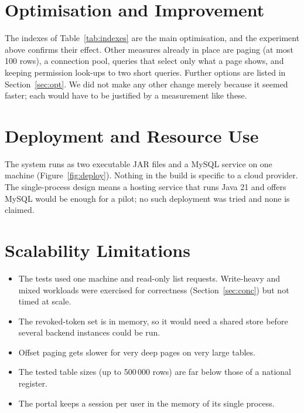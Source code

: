 \section{Optimisation and Improvement}
The indexes of Table~\ref{tab:indexes} are the main optimisation, and the experiment above
confirms their effect. Other measures already in place are paging (at most 100 rows), a
connection pool, queries that select only what a page shows, and keeping permission
look-ups to two short queries. Further options are listed in Section~\ref{sec:opt}. We
did not make any other change merely because it seemed faster; each would have to be
justified by a measurement like these.

\section{Deployment and Resource Use}
The system runs as two executable JAR files and a MySQL service on one machine
(Figure~\ref{fig:deploy}). Nothing in the build is specific to a cloud provider. The
single-process design means a hosting service that runs Java 21 and offers MySQL would be
enough for a pilot; no such deployment was tried and none is claimed.

\section{Scalability Limitations}
\begin{itemize}
\item The tests used one machine and read-only list requests. Write-heavy and mixed workloads were exercised for correctness (Section~\ref{sec:conc}) but not timed at scale.
\item The revoked-token set is in memory, so it would need a shared store before several backend instances could be run.
\item Offset paging gets slower for very deep pages on very large tables.
\item The tested table sizes (up to 500\,000 rows) are far below those of a national register.
\item The portal keeps a session per user in the memory of its single process.
\end{itemize}
